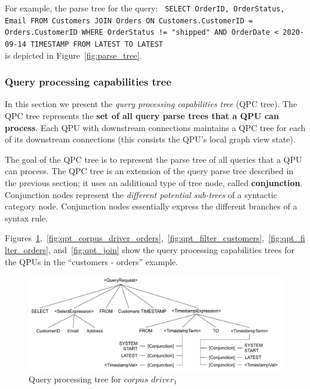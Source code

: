 \noindent
For example, the parse tree for the query:
{\obeylines\obeyspaces
\texttt{
        SELECT OrderID, OrderStatus, Email
        FROM Customers JOIN Orders ON Customers.CustomerID = Orders.CustomerID
        WHERE OrderStatus != "shipped" AND OrderDate < 2020-09-14
        TIMESTAMP FROM LATEST TO LATEST
        }}
~ \\
\noindent
is depicted in Figure~\ref{fig:parse_tree}.

\subsubsection{Query processing capabilities tree}
\label{sec:qpc_tree}

In this section we present the \textit{query processing capabilities tree} (QPC tree).
The QPC tree represents the \textbf{set of all query parse trees that a QPU can process}.
Each QPU with downstream connections maintains a QPC tree for each of its downstream connections
(this consists the QPU's local graph view state).

The goal of the QPC tree is to represent the parse tree of all queries that a QPU can process.
The QPC tree is an extension of the query parse tree described in the previous section;
it uses an additional type of tree node, called \textbf{conjunction}.
Conjunction nodes represent the \textit{different potential sub-trees} of a syntactic category node.
Conjunction nodes essentially express the different branches of a syntax rule.

Figures~\ref{fig:qpt_corpus_driver_customers},~\ref{fig:qpt_corpus_driver_orders},~\ref{fig:qpt_filter_customers},~\ref{fig:qpt_filter_orders}, and~\ref{fig:qpt_join}
show the query processing capabilities trees for the QPUs in the ``customers - orders'' example.

\begin{figure}[t]
  \centering
    \includegraphics[width=\textwidth]{./figures/design_pattern/qpt_corpus_driver_customers.pdf}
  \caption{Query processing tree for $corpus$ $driver_1$}
  \label{fig:qpt_corpus_driver_customers}
\end{figure}

